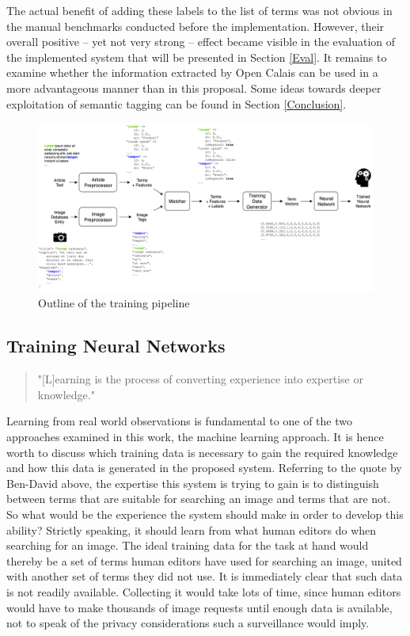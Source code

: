 \documentclass[11pt,a4paper,twoside]{article}
\begin{document}
The actual benefit of adding these labels to the list of terms was not obvious in the manual benchmarks conducted before the implementation. However, their overall positive -- yet not very strong -- effect became visible in the evaluation of the implemented system that will be presented in Section \ref{Eval}. It remains to examine whether the information extracted by Open Calais can be used in a more advantageous manner than in this proposal. Some ideas towards deeper exploitation of semantic tagging can be found in Section \ref{Conclusion}.

\begin{figure}[ht]
  \includegraphics[width=\columnwidth]{picpic-training.png}
  \caption{Outline of the training pipeline}
  \label{fig:picpic-training}
\end{figure}

\subsection{Training Neural Networks} \label{SystemTrain}

\begin{quote}
    "[L]earning is the process of converting experience into expertise or knowledge."
    
    \cite[p. 1]{Shalev-Shwartz2014UnderstandingAlgorithms}
\end{quote}

\noindent Learning from real world observations is fundamental to one of the two approaches examined in this work, the machine learning approach. It is hence worth to discuss which training data is necessary to gain the required knowledge and how this data is generated in the proposed system. Referring to the quote by Ben-David above, the expertise this system is trying to gain is to distinguish between terms that are suitable for searching an image and terms that are not. So what would be the experience the system should make in order to develop this ability? Strictly speaking, it should learn from what human editors do when searching for an image. The ideal training data for the task at hand would thereby be a set of terms human editors have used for searching an image, united with another set of terms they did not use. It is immediately clear that such data is not readily available. Collecting it would take lots of time, since human editors would have to make thousands of image requests until enough data is available, not to speak of the privacy considerations such a surveillance would imply.
\end{document}
